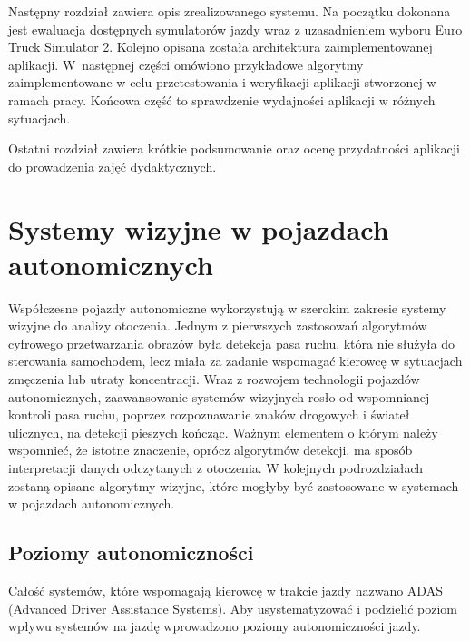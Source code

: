 Następny rozdział zawiera opis zrealizowanego systemu. 
Na początku dokonana jest ewaluacja dostępnych symulatorów jazdy wraz z uzasadnieniem wyboru Euro Truck Simulator 2. 
Kolejno opisana została architektura zaimplementowanej aplikacji. 
W~następnej części omówiono przykładowe algorytmy zaimplementowane w celu przetestowania i weryfikacji aplikacji stworzonej w ramach pracy. 
Końcowa część to sprawdzenie wydajności aplikacji w różnych sytuacjach.

Ostatni rozdział zawiera krótkie podsumowanie oraz ocenę przydatności aplikacji do prowadzenia zajęć dydaktycznych.


\chapter{Systemy wizyjne w pojazdach autonomicznych}
Współczesne pojazdy autonomiczne wykorzystują w szerokim zakresie systemy wizyjne do analizy otoczenia. Jednym z pierwszych zastosowań algorytmów cyfrowego przetwarzania obrazów była detekcja pasa ruchu, która nie służyła do sterowania samochodem, lecz miała za zadanie wspomagać kierowcę w sytuacjach zmęczenia lub utraty koncentracji. Wraz z rozwojem technologii pojazdów autonomicznych, zaawansowanie systemów wizyjnych rosło od wspomnianej kontroli pasa ruchu, poprzez rozpoznawanie znaków drogowych i świateł ulicznych, na detekcji pieszych kończąc. Ważnym elementem o którym należy wspomnieć, że istotne znaczenie, oprócz algorytmów detekcji, ma sposób interpretacji danych odczytanych z otoczenia. W kolejnych podrozdziałach zostaną opisane algorytmy wizyjne, które mogłyby być zastosowane w systemach w pojazdach autonomicznych. 

\section{Poziomy autonomiczności}

Całość systemów, które wspomagają kierowcę w trakcie jazdy nazwano ADAS (Advanced Driver Assistance Systems). Aby usystematyzować  i podzielić poziom wpływu systemów na jazdę wprowadzono poziomy autonomiczności jazdy.

